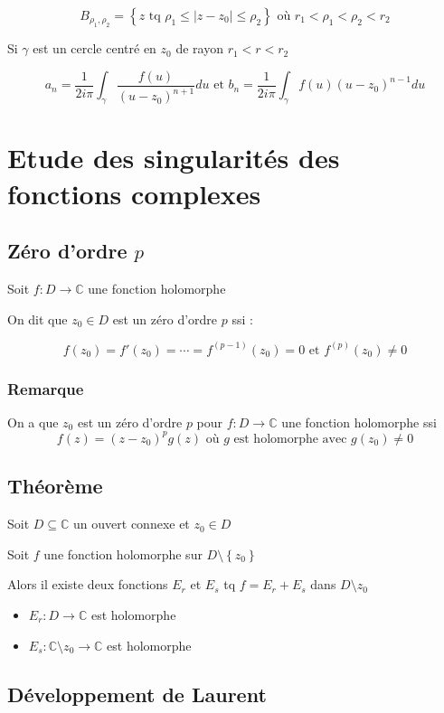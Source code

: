 \documentclass[a4paper,10pt]{report}
\newcommand{\ap}{\rightarrow}
\newcommand{\C}{\mathbb{C}}
\newcommand{\tset}[1]{\left\lbrace #1 \right\rbrace}
\newcommand{\abs}[1]{\left\vert #1 \right\vert}
\newcommand{\AND}{\mbox{ et }}
\begin{document}
\[B_{\rho_1,\rho_2} = \tset{z \mbox{ tq } \rho_1 \leq \abs{z - z_0} \leq
\rho_2} \mbox{ où } r_1 < \rho_1 < \rho_2 < r_2\]

Si $\gamma$ est un cercle centré en $z_0$ de rayon $r_1 < r < r_2$

\[a_n = \frac{1}{2i\pi} \int_\gamma \frac{f(u)}{(u-z_0)^{n+1}} du \AND b_n=
\frac{1}{2i\pi} \int_\gamma f(u)(u-z_0)^{n-1} du \]

\section{Etude des singularités des fonctions complexes}

\subsection{Zéro d'ordre $p$}

Soit $f : D \ap \C$ une fonction holomorphe

On dit que $z_0 \in D$ est un zéro d'ordre $p$ ssi :

\[f(z_0) = f'(z_0) = \cdots = f^{(p-1)}(z_0) = 0 \AND f^{(p)}(z_0) \neq 0 \]

\subsubsection{Remarque}

On a que $z_0$ est un zéro d'ordre $p$ pour $f : D \ap \C$ une fonction
holomorphe ssi
\[f(z) = (z-z_0)^p g(z) \mbox{ où } g \mbox{ est holomorphe avec } g(z_0)
\neq 0 \]

\subsection{Théorème}

Soit $D \subseteq \C$ un ouvert connexe et $z_0 \in D$

Soit $f$ une fonction holomorphe sur $D \setminus\tset{z_0}$

Alors il existe deux fonctions $E_r$ et $E_s$ tq $f = E_r + E_s$ dans $D\setminus{z_0}$

\begin{itemize}
\item{$E_r : D \ap \C$ est holomorphe}
\item{$E_s : \C\setminus{z_0} \ap \C$ est holomorphe}
\end{itemize}

\subsection{Développement de Laurent}
\end{document}
